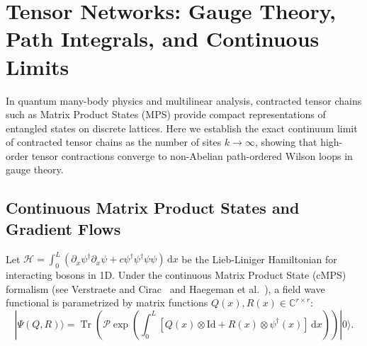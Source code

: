 \documentclass[11pt,a4paper,reqno]{amsart}
\theoremstyle{definition}
\numberwithin{equation}{section}
\newcommand{\C}{\mathbb{C}}
\newcommand{\Id}{\mathrm{Id}}
\newcommand{\Tr}{\operatorname{Tr}}
\newcommand{\dif}{\,\mathrm{d}}
\begin{document}
\section{Tensor Networks: Gauge Theory, Path Integrals, and Continuous Limits}
\label{sec:tensor_networks}

In quantum many-body physics and multilinear analysis, contracted tensor chains such as Matrix Product States (MPS) provide compact representations of entangled states on discrete lattices. Here we establish the exact continuum limit of contracted tensor chains as the number of sites $k \to \infty$, showing that high-order tensor contractions converge to non-Abelian path-ordered Wilson loops in gauge theory.

\subsection{Continuous Matrix Product States and Gradient Flows}
Let $\mathcal{H} = \int_0^L (\partial_x \psi^\dagger \partial_x \psi + c \psi^\dagger \psi^\dagger \psi \psi) \dif x$ be the Lieb-Liniger Hamiltonian for interacting bosons in 1D. Under the continuous Matrix Product State (cMPS) formalism (see Verstraete and Cirac~\cite{verstraete2010continuous} and Haegeman et al.~\cite{haegeman2011tdvp}), a field wave functional is parametrized by matrix functions $Q(x), R(x) \in \C^{r \times r}$:
\begin{equation}
    \label{eq:cmps_state}
    |\Psi(Q, R)\rangle = \Tr\left( \mathcal{P} \exp\left( \int_0^L [Q(x) \otimes \Id + R(x) \otimes \psi^\dagger(x)] \dif x \right) \right) |0\rangle.
\end{equation}
\end{document}
